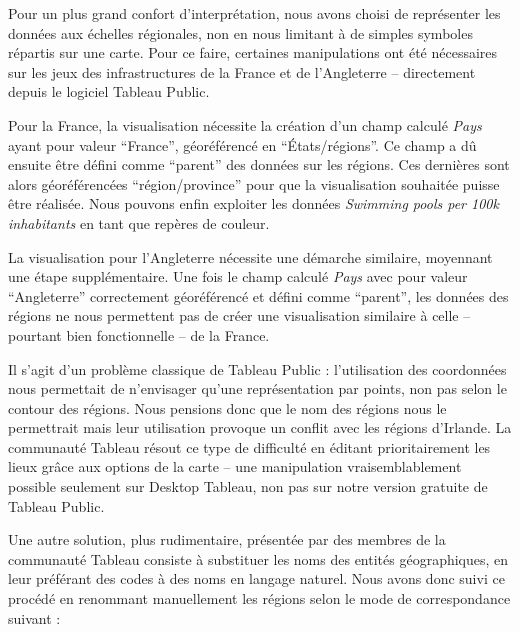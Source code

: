 \documentclass[hidelinks, 12pt]{report}
\begin{document}
Pour un plus grand confort d'interprétation, nous avons choisi de représenter les données aux échelles régionales, non en nous limitant à de simples symboles répartis sur une carte. Pour ce faire, certaines manipulations ont été nécessaires sur les jeux des infrastructures de la France et de l’Angleterre -- directement depuis le logiciel Tableau Public.

Pour la France, la visualisation nécessite la création d'un champ calculé \textit{Pays} ayant pour valeur \enquote{France}, géoréférencé en \enquote{États/régions}. Ce champ a dû ensuite être défini comme \enquote{parent} des données sur les régions. Ces dernières sont alors géoréférencées \enquote{région/province} pour que la visualisation souhaitée puisse être réalisée. Nous pouvons enfin exploiter les données \textit{Swimming pools per 100k inhabitants} en tant que repères de couleur.

La visualisation pour l'Angleterre nécessite une démarche similaire, moyennant une étape supplémentaire. Une fois le champ calculé \textit{Pays} avec pour valeur \enquote{Angleterre} correctement géoréférencé et défini comme \enquote{parent}, les données des régions ne nous permettent pas de créer une visualisation similaire à celle -- pourtant bien fonctionnelle -- de la France.

Il s'agit d'un problème classique de Tableau Public : l'utilisation des coordonnées nous permettait de n'envisager qu'une représentation par points, non pas selon le contour des régions. Nous pensions donc que le nom des régions nous le permettrait mais leur utilisation provoque un conflit avec les régions d'Irlande. La communauté Tableau résout ce type de difficulté en éditant prioritairement les lieux grâce aux options de la carte -- une manipulation vraisemblablement possible seulement sur Desktop Tableau, non pas sur notre version gratuite de Tableau Public.

Une autre solution, plus rudimentaire, présentée par des membres de la communauté Tableau consiste à substituer les noms des entités géographiques, en leur préférant des codes à des noms en langage naturel. Nous avons donc suivi ce procédé en renommant manuellement les régions selon le mode de correspondance suivant :
\end{document}
